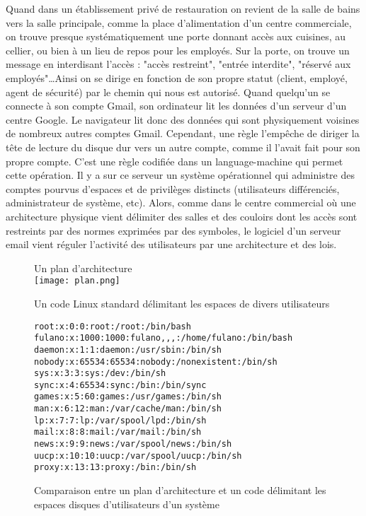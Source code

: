 Quand dans un établissement privé de restauration on revient de la salle de bains vers la salle principale, comme la place d'alimentation d'un centre commerciale, on trouve presque systématiquement une porte donnant accès aux cuisines, au cellier, ou bien à un lieu de repos pour les employés. Sur la porte, on trouve un message en interdisant l'accès : "accès restreint", "entrée interdite", "réservé aux employés"\ldots Ainsi on se dirige en fonction de son propre statut (client, employé, agent de sécurité) par le chemin qui nous est autorisé. Quand quelqu'un se connecte à son compte Gmail, son ordinateur lit les données d'un serveur d'un centre Google. Le navigateur lit donc des données qui sont physiquement voisines de nombreux autres comptes Gmail. Cependant, une règle l'empêche de diriger la tête de lecture du disque dur vers un autre compte, comme il l'avait fait pour son propre compte. C'est une règle codifiée dans un language-machine qui permet cette opération. Il y a sur ce serveur un système opérationnel qui administre des comptes pourvus d'espaces et de privilèges distincts (utilisateurs différenciés, administrateur de système, etc). Alors, comme dans le centre commercial où une architecture physique vient délimiter des salles et des couloirs dont les accès sont restreints par des normes exprimées par des symboles, le logiciel d'un serveur email vient réguler l'activité des utilisateurs par une architecture et des lois.

\begin{figure}[htb]
\caption{Comparaison entre un plan d'architecture et un code délimitant les espaces disques d'utilisateurs d'un système} \label{fig2.3}

\begin{multicols}{2}

Un plan d'architecture 
\\
\texttt{[image: plan.png]}

\columnbreak

Un code Linux standard délimitant les espaces de divers utilisateurs

{\scriptsize
\begin{verbatim}
root:x:0:0:root:/root:/bin/bash
fulano:x:1000:1000:fulano,,,:/home/fulano:/bin/bash
daemon:x:1:1:daemon:/usr/sbin:/bin/sh
nobody:x:65534:65534:nobody:/nonexistent:/bin/sh
sys:x:3:3:sys:/dev:/bin/sh
sync:x:4:65534:sync:/bin:/bin/sync
games:x:5:60:games:/usr/games:/bin/sh
man:x:6:12:man:/var/cache/man:/bin/sh
lp:x:7:7:lp:/var/spool/lpd:/bin/sh
mail:x:8:8:mail:/var/mail:/bin/sh
news:x:9:9:news:/var/spool/news:/bin/sh
uucp:x:10:10:uucp:/var/spool/uucp:/bin/sh
proxy:x:13:13:proxy:/bin:/bin/sh
\end{verbatim}
}
\end{multicols}
\end{figure}

